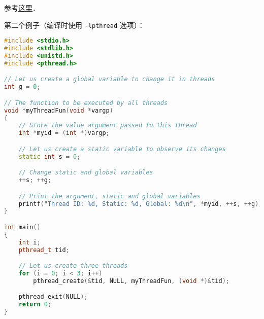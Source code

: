 
\begin{issues}
\issueDraft
\end{issues}

参考\href{https://www.geeksforgeeks.org/multithreading-c-2/}{这里}．

第二个例子（编译时使用 \verb|-lpthread| 选项）：
\begin{lstlisting}[language=cpp]
#include <stdio.h>
#include <stdlib.h>
#include <unistd.h>
#include <pthread.h>

// Let us create a global variable to change it in threads
int g = 0;

// The function to be executed by all threads
void *myThreadFun(void *vargp)
{
	// Store the value argument passed to this thread
	int *myid = (int *)vargp;

	// Let us create a static variable to observe its changes
	static int s = 0;

	// Change static and global variables
	++s; ++g;

	// Print the argument, static and global variables
	printf("Thread ID: %d, Static: %d, Global: %d\n", *myid, ++s, ++g);
}

int main()
{
	int i;
	pthread_t tid;

	// Let us create three threads
	for (i = 0; i < 3; i++)
		pthread_create(&tid, NULL, myThreadFun, (void *)&tid);

	pthread_exit(NULL);
	return 0;
}
\end{lstlisting}

